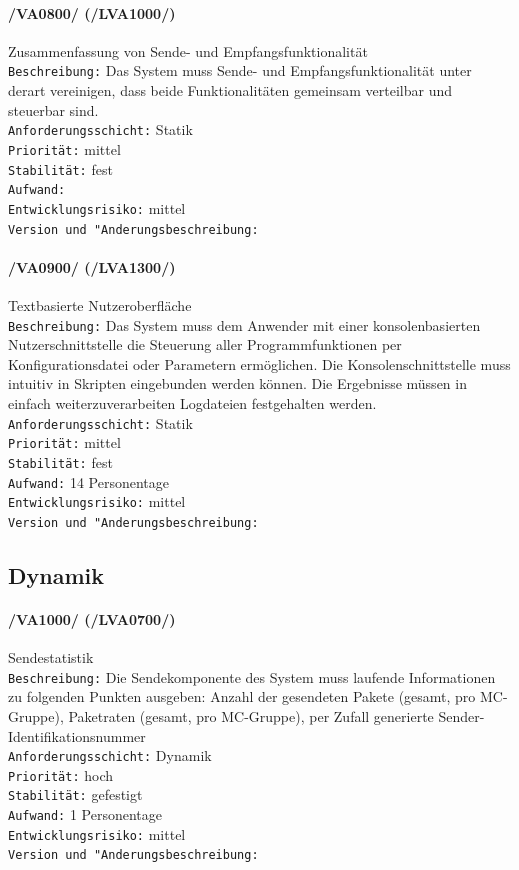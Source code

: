 \paragraph{/VA0800/ (/LVA1000/)} Zusammenfassung von Sende- und
Empfangsfunktionalität\\
\texttt{Beschreibung:} Das System muss Sende- und Empfangsfunktionalität
unter derart vereinigen, dass beide Funktionalitäten gemeinsam verteilbar und
steuerbar sind.\\
\texttt{Anforderungsschicht:}
Statik\\ \texttt{Priorität:} mittel\\
\texttt{Stabilität:} fest\\
\texttt{Aufwand:}\\
\texttt{Entwicklungsrisiko:} mittel\\
\texttt{Version und "Anderungsbeschreibung:}

\paragraph{/VA0900/ (/LVA1300/)} Textbasierte Nutzeroberfläche\\
\texttt{Beschreibung:} Das System muss dem Anwender mit einer konsolenbasierten
Nutzerschnittstelle die Steuerung aller Programmfunktionen per
Konfigurationsdatei oder Parametern ermöglichen. Die Konsolenschnittstelle muss
intuitiv in Skripten eingebunden werden können. Die Ergebnisse müssen in einfach weiterzuverarbeiten
Logdateien festgehalten werden.\\
\texttt{Anforderungsschicht:} Statik\\
\texttt{Priorität:} mittel\\
\texttt{Stabilität:} fest\\
\texttt{Aufwand:} 14 Personentage\\
\texttt{Entwicklungsrisiko:} mittel\\
\texttt{Version und "Anderungsbeschreibung:}

\subsection{Dynamik}
\label{sec:dynamik}

\paragraph{/VA1000/ (/LVA0700/)} Sendestatistik\\
\texttt{Beschreibung:} Die Sendekomponente des System muss laufende
Informationen zu folgenden Punkten ausgeben: Anzahl der gesendeten Pakete
(gesamt, pro MC-Gruppe), Paketraten (gesamt, pro MC-Gruppe), per Zufall
generierte Sender-Identifikationsnummer\\
\texttt{Anforderungsschicht:} Dynamik\\
\texttt{Priorität:} hoch\\
\texttt{Stabilität:} gefestigt\\
\texttt{Aufwand:} 1 Personentage\\
\texttt{Entwicklungsrisiko:} mittel\\
\texttt{Version und "Anderungsbeschreibung:}

